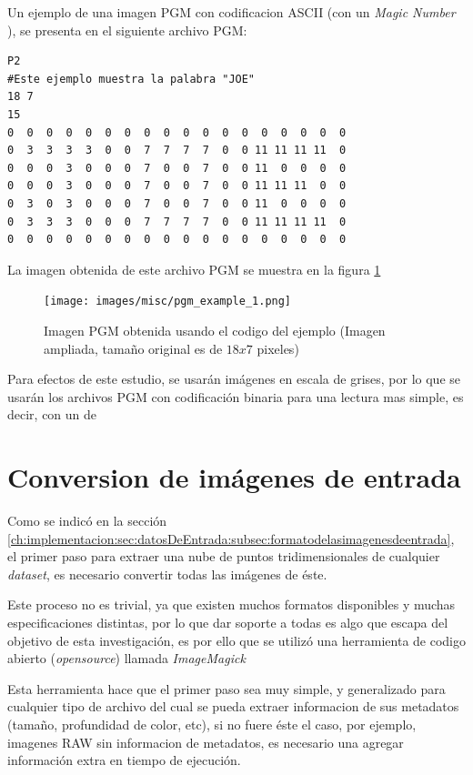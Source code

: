 Un ejemplo de una imagen PGM con codificacion ASCII (con un \emph{Magic Number} ), se presenta en el siguiente archivo PGM:

\begin{verbatim}
P2
#Este ejemplo muestra la palabra "JOE"
18 7
15
0  0  0  0  0  0  0  0  0  0  0  0  0  0  0  0  0  0
0  3  3  3  3  0  0  7  7  7  7  0  0 11 11 11 11  0
0  0  0  3  0  0  0  7  0  0  7  0  0 11  0  0  0  0
0  0  0  3  0  0  0  7  0  0  7  0  0 11 11 11  0  0
0  3  0  3  0  0  0  7  0  0  7  0  0 11  0  0  0  0
0  3  3  3  0  0  0  7  7  7  7  0  0 11 11 11 11  0
0  0  0  0  0  0  0  0  0  0  0  0  0  0  0  0  0  0
\end{verbatim}

La imagen obtenida de este archivo PGM se muestra en la figura \ref{f:implementacion:sec:formatos:pgm_example_1}

\begin{figure}[hbt]
	\centering
	\texttt{[image: images/misc/pgm\_example\_1.png]}
	\caption{Imagen PGM obtenida usando el codigo del ejemplo (Imagen ampliada, tamaño original es de $18x7$ pixeles)}
	\label{f:implementacion:sec:formatos:pgm_example_1}
\end{figure}

Para efectos de este estudio, se usarán imágenes en escala de grises, por lo que se usarán los archivos PGM con codificación binaria para una lectura mas simple, es decir, con un  de 

\section{Conversion de imágenes de entrada}
\label{ch:implementacion:sec:conversiondeimagenesdeentrada}

Como se indicó en la sección \ref{ch:implementacion:sec:datosDeEntrada:subsec:formatodelasimagenesdeentrada}, el primer paso para extraer una nube de puntos tridimensionales de cualquier \emph{dataset}, es necesario convertir todas las imágenes de éste.

Este proceso no es trivial, ya que existen muchos formatos disponibles y muchas especificaciones distintas, por lo que dar soporte a todas es algo que escapa del objetivo de esta investigación, es por ello que se utilizó una herramienta de codigo abierto (\emph{opensource}) llamada \emph{ImageMagick}

Esta herramienta hace que el primer paso sea muy simple, y generalizado para cualquier tipo de archivo del cual se pueda extraer informacion de sus metadatos (tamaño, profundidad de color, etc), si no fuere éste el caso, por ejemplo, imagenes RAW sin informacion de metadatos, es necesario una agregar información extra en tiempo de ejecución.

